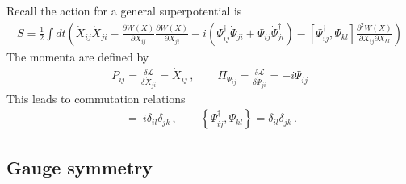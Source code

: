 \documentclass[a4paper,11pt]{article}
\numberwithin{equation}{section}
\begin{document}
Recall the action for a general superpotential is 
%
\begin{align}
    S = \frac{1}{2} \int dt   \left(  \dot{X}_{ij} \dot{X}_{ji}  - \frac{\partial W(X)}{\partial X_{ij}} \frac{\partial W(X)}{\partial X_{ji}} - i \left( \Psi_{ij}^\dagger \dot{\Psi}_{ji} + \Psi_{ij} \dot{\Psi}_{ji}^\dagger \right) -  [\Psi^\dagger_{ij} , \Psi_{kl}] \frac{\partial^2 W(X)}{\partial X_{ij} \partial X_{kl}}\right)
\end{align}
%
The momenta are defined by 
%
\begin{align}
    P_{ij} = \frac{\delta \mathcal{L}}{\delta \dot X_{ji}} = \dot X_{ij}\, , \qquad \Pi_{\Psi_{ij}} = \frac{\delta \mathcal{L}}{\delta \dot \Psi_{ji}} =  - i  \Psi^\dagger_{ij}
\end{align}
%
This leads to commutation relations 
%
\begin{align}
    [X_{ij}, P_{kl}] \ = \ i \delta_{il} \delta_{jk} \, , \qquad \left\{ \Psi^\dagger_{ij}, \Psi_{kl} \right\} = \delta_{il} \delta_{jk} \, .
\end{align}

\subsection{Gauge symmetry}
\end{document}

